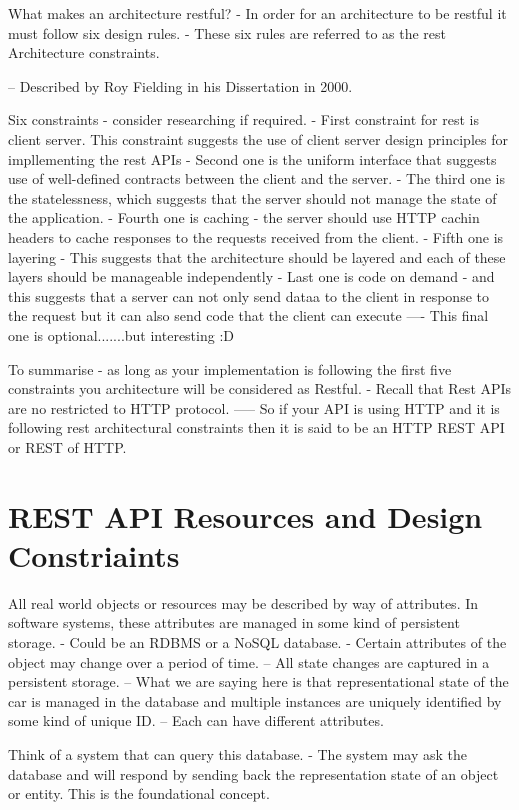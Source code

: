 What makes an architecture restful?
- In order for an architecture to be restful it must follow six design rules.
- These six rules are referred to as the rest Architecture constraints.

-- Described by Roy Fielding in his Dissertation in 2000.

Six constraints - consider researching if required.
- First constraint for rest is client server. This constraint suggests the use of client server design principles for impllementing the rest APIs
- Second one is the uniform interface that suggests use of well-defined contracts between the client and the server.
- The third one is the statelessness, which suggests that the server should not manage the state of the application.
- Fourth one is caching - the server should use HTTP cachin headers to cache responses to the requests received from the client.
- Fifth one is layering - This suggests that the architecture should be layered and each of these layers should be manageable independently
- Last one is code on demand - and this suggests that a server can not only send dataa to the client in response to the request but it can also send code that the client can execute
---- This final one is optional.......but interesting :D

To summarise - as long as your implementation is following the first five constraints you architecture will be considered as Restful.
- Recall that Rest APIs are no restricted to HTTP protocol.
----- So if your API is using HTTP and it is following rest architectural constraints then it is said to be an HTTP REST API or REST of HTTP.

\section{REST API Resources and Design Constriaints}
All real world objects or resources may be described by way of attributes.
In software systems, these attributes are managed in some kind of persistent storage.
- Could be an RDBMS or a NoSQL database.
- Certain attributes of the object may change over a period of time.
-- All state changes are captured in a persistent storage.
-- What we are saying here is that representational state of the car is managed in the database and multiple instances are uniquely identified by some kind of unique ID.
-- Each can have different attributes.

Think of a system that can query this database.
- The system may ask the database and will respond by sending back the representation state of an object or entity.
This is the foundational concept.

